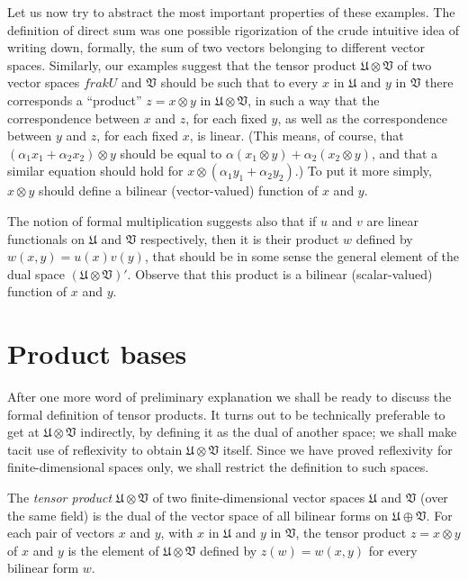Let us now try to abstract the most important properties of these examples. The
definition of direct sum was one possible rigorization of the crude intuitive
idea of writing down, formally, the sum of two vectors belonging to different
vector spaces. Similarly, our examples suggest that the tensor product
\(\mathfrak{U} \otimes \mathfrak{V}\) of two vector spaces \(frak{U}\) and
\(\mathfrak{V}\) should be such that to every \(x\) in \(\mathfrak{U}\) and
\(y\) in \(\mathfrak{V}\) there corresponds a ``product'' \(z = x \otimes y\) in
\(\mathfrak{U} \otimes \mathfrak{V}\), in such a way that the correspondence
between \(x\) and \(z\), for each fixed \(y\), as well as the correspondence
between \(y\) and \(z\), for each fixed \(x\), is linear. (This means, of
course, that \((\alpha_1 x_1 + \alpha_2 x_2) \otimes y\) should be equal to
\(\alpha(x_1 \otimes y) + \alpha_2 (x_2 \otimes y)\), and that a similar
equation should hold for \(x \otimes (\alpha_1 y_1 + \alpha_2 y_2).\))  To put
it more simply, \(x \otimes y\) should define a bilinear (vector-valued)
function of \(x\) and \(y\).

The notion of formal multiplication suggests also that if \(u\) and \(v\) are
linear functionals on \(\mathfrak{U}\) and \(\mathfrak{V}\) respectively, then
it is their product \(w\) defined by \(w(x, y) = u(x)v(y)\), that should be in
some sense the general element of the dual space \((\mathfrak{U} \otimes
\mathfrak{V})'\). Observe that this product is a bilinear (scalar-valued)
function of \(x\) and \(y\).

\section{Product bases}

After one more word of preliminary explanation we shall be ready to discuss the
formal definition of tensor products. It turns out to be technically preferable
to get at \(\mathfrak{U} \otimes \mathfrak{V}\) indirectly, by defining it as
the dual of another space; we shall make tacit use of reflexivity to obtain
\(\mathfrak{U} \otimes \mathfrak{V}\) itself. Since we have proved reflexivity
for finite-dimensional spaces only, we shall restrict the definition to such
spaces.

\begin{definition}
    The \emph{tensor product} \(\mathfrak{U} \otimes \mathfrak{V}\) of two
    finite-dimensional vector spaces \(\mathfrak{U}\) and \(\mathfrak{V}\) (over
    the same field) is the dual of the vector space of all bilinear forms on
    \(\mathfrak{U} \oplus \mathfrak{V}\). For each pair of vectors \(x\) and
    \(y\), with \(x\) in \(\mathfrak{U}\) and \(y\) in \(\mathfrak{V}\), the
    tensor product \(z = x\otimes y\) of \(x\) and \(y\) is the element of
    \(\mathfrak{U} \otimes \mathfrak{V}\) defined by \(z(w) = w(x, y)\) for
    every bilinear form \(w\).
\end{definition}

